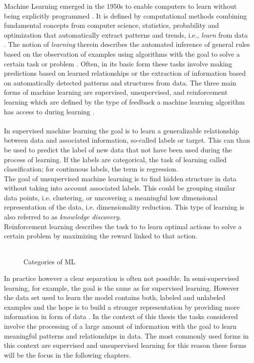 Machine Learning emerged in the 1950s to enable computers to learn without being explicitly programmed \cite{Samual1959}. It is defined by computational methods combining fundamental concepts from computer science, statistics, probability and optimization that automatically extract patterns and trends, i.e., \textit{learn} from data \cite{Hastie2009}. The notion of \textit{learning} therein describes the automated inference of general rules based on the observation of examples using algorithms with the goal to solve a certain task or problem \cite{Von_luxburg2011}. Often, in its basic form these tasks involve making predictions based on learned relationships or the extraction of information based on automatically detected patterns and structures from data. The three main forms of machine learning are supervised, unsupervised, and reinforcement learning which are defined by the type of feedback a machine learning algorithm has access to during learning \cite{Shalev2014}.\\
\\
In supervised machine learning the goal is to learn a generalizable relationship between data and associated information, so-called labels or target. This can than be used to predict the label of new data that not have been used during the process of learning. If the labels are categorical, the task of learning called classification; for continuous labels, the term is regression.\\
The goal of unsupervised machine learning is to find hidden structure in data without taking into account associated labels. This could be grouping similar data points, i.e. clustering, or uncovering a meaningful low dimensional representation of the data, i.e. dimensionality reduction. This type of learning is also referred to as \textit{knowledge discovery}.\\
Reinforcement learning describes the task to to learn optimal actions to solve a certain problem by maximizing the reward linked to that action.\\
\\
\begin{figure*}[h]
  \caption{Categories of ML}
  \label{fig1:ml_types}
\end{figure*}

In practice however a clear separation is often not possible. In semi-supervised learning, for example, the goal is the same as for supervised learning. However the data set used to learn the model contains both, labeled and unlabeled examples and the hope is to build a stronger representation by providing more information in form of data \cite{Burkov2019}. In the context of this thesis the tasks considered involve the processing of a large amount of information with the goal to learn meaningful patterns and relationships in data. The most commonly used forms in this context are supervised and unsupervised learning for this reason these forms will be the focus in the following chapters. %

